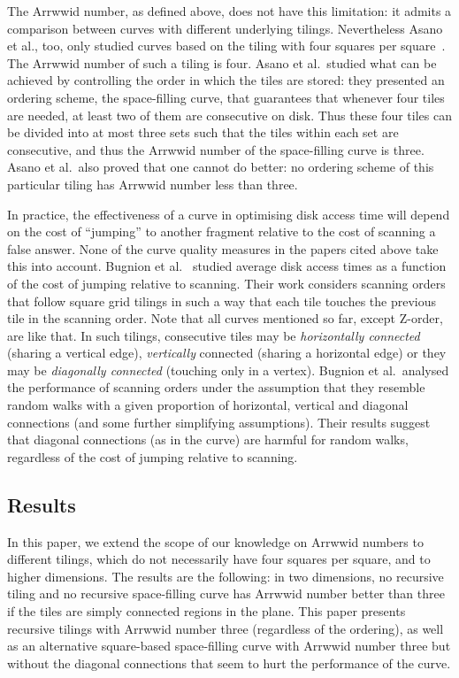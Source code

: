 \documentclass[11pt,a4paper]{article}
\newcommand{\ARRWW}{\xspace}
\begin{document}
The Arrwwid number, as defined above, does not have this limitation: it admits a comparison between curves with different underlying tilings. Nevertheless Asano et al., too, only studied curves based on the tiling with four squares per square~\cite{Asano1997}. The Arrwwid number of such a tiling is four. Asano et al.\ studied what can be achieved by controlling the order in which the tiles are stored: they presented an ordering scheme, the \ARRWW space-filling curve, that guarantees that whenever four tiles are needed, at least two of them are consecutive on disk. Thus these four tiles can be divided into at most three sets such that the tiles within each set are consecutive, and thus the Arrwwid number of the \ARRWW space-filling curve is three. Asano et al.\ also proved that one cannot do better: no ordering scheme of this particular tiling has Arrwwid number less than three.

In practice, the effectiveness of a curve in optimising disk access time will depend on the cost of ``jumping'' to another fragment relative to the cost of scanning a false answer. None of the curve quality measures in the papers cited above take this into account. Bugnion et al.~\cite{Bugnion1997} studied average disk access times as a function of the cost of jumping relative to scanning. Their work considers scanning orders that follow square grid tilings in such a way that each tile touches the previous tile in the scanning order. Note that all curves mentioned so far, except Z-order, are like that. In such tilings, consecutive tiles may be \emph{horizontally connected} (sharing a vertical edge), \emph{vertically} connected (sharing a horizontal edge) or they may be \emph{diagonally connected} (touching only in a vertex). Bugnion et al.\ analysed the performance of scanning orders under the assumption that they resemble random walks with a given proportion of horizontal, vertical and diagonal connections (and some further simplifying assumptions). Their results suggest that diagonal connections (as in the \ARRWW curve) are harmful for random walks, regardless of the cost of jumping relative to scanning.

\subsection{Results}
In this paper, we extend the scope of our knowledge on Arrwwid numbers to different tilings, which do not necessarily have four squares per square, and to higher dimensions. The results are the following: in two dimensions, no recursive tiling and no recursive space-filling curve has Arrwwid number better than three if the tiles are simply connected regions in the plane. This paper presents recursive tilings with Arrwwid number three (regardless of the ordering), as well as an alternative square-based space-filling curve with Arrwwid number three but without the diagonal connections that seem to hurt the performance of the \ARRWW curve.
\end{document}
